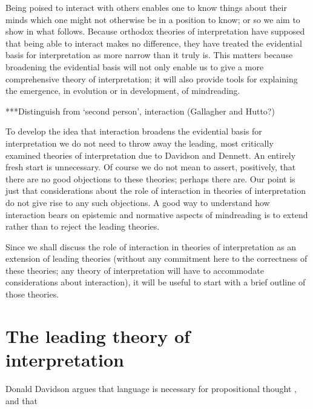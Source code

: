 \documentclass[12pt,a4paper]{extarticle}
\begin{document}
Being poised to interact with others enables one to know things about their minds which one might not otherwise be in a position to know; or so we aim to show in what follows.
Because orthodox theories of interpretation have supposed that being able to interact makes no difference,
they have treated the evidential basis for interpretation as more narrow than it truly is.
This matters because broadening the evidential basis will not only enable us to give a more comprehensive theory of interpretation; 
it will also provide tools for explaining the emergence, in evolution or in development, of mindreading.


***Distinguish from `second person', interaction (Gallagher and Hutto?)


To develop the idea that 
interaction broadens the evidential basis for interpretation
we do not need to throw away the leading, most critically examined theories of interpretation due to Davidson and Dennett.
An entirely fresh start is unnecessary.
Of course we do not mean to assert, positively, that there are no good objections to these theories; perhaps there are.
Our point is just that considerations about the role of interaction in theories of interpretation do not give rise to any such objections.
A good way to understand how interaction bears on epistemic and normative aspects of mindreading is to extend rather than to reject the leading theories.

Since we shall discuss the role of interaction in theories of interpretation as an extension of leading theories (without any commitment here to the correctness of these theories; any theory of interpretation will have to accommodate considerations about interaction), it will be useful to start with a brief outline of those theories.



\section{The leading theory of interpretation}



Donald Davidson argues that language is necessary for propositional thought \citep[p.\ 130]{Davidson:1999mo},
and that




\end{document}
